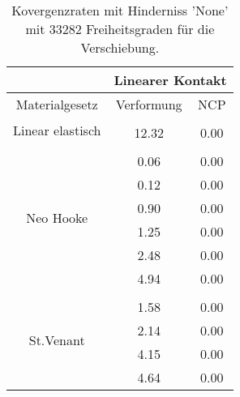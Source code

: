\begin{table} 
\centering 
\begin{tabular}{c|cc|} 
\cline{2-3} 
 & \multicolumn{2}{|c|}{Linearer Kontakt} \\ 
\hline 
\multicolumn{1}{|c|}{Materialgesetz} & \multicolumn{1}{c|}{Verformung} & \multicolumn{1}{c|}{NCP} \\ 
\hline 
\multicolumn{1}{|c|}{\multirow{2}{*}{Linear elastisch}} &\multicolumn{1}{|c|}{} & \multicolumn{1}{|c|}{} \\ 
\multicolumn{1}{|c|}{} & \multicolumn{1}{|c|}{     12.32} & \multicolumn{1}{|c|}{      0.00} \\ 
\hline 
\multicolumn{1}{|c|}{\multirow{7}{*}{Neo Hooke}} &\multicolumn{1}{|c|}{} & \multicolumn{1}{|c|}{} \\ 
\multicolumn{1}{|c|}{} & \multicolumn{1}{|c|}{      0.06} & \multicolumn{1}{|c|}{      0.00} \\ 
\multicolumn{1}{|c|}{} & \multicolumn{1}{|c|}{      0.12} & \multicolumn{1}{|c|}{      0.00} \\ 
\multicolumn{1}{|c|}{} & \multicolumn{1}{|c|}{      0.90} & \multicolumn{1}{|c|}{      0.00} \\ 
\multicolumn{1}{|c|}{} & \multicolumn{1}{|c|}{      1.25} & \multicolumn{1}{|c|}{      0.00} \\ 
\multicolumn{1}{|c|}{} & \multicolumn{1}{|c|}{      2.48} & \multicolumn{1}{|c|}{      0.00} \\ 
\multicolumn{1}{|c|}{} & \multicolumn{1}{|c|}{      4.94} & \multicolumn{1}{|c|}{      0.00} \\ 
\hline 
\multicolumn{1}{|c|}{\multirow{5}{*}{St.Venant}} &\multicolumn{1}{|c|}{} & \multicolumn{1}{|c|}{} \\ 
\multicolumn{1}{|c|}{} & \multicolumn{1}{|c|}{      1.58} & \multicolumn{1}{|c|}{      0.00} \\ 
\multicolumn{1}{|c|}{} & \multicolumn{1}{|c|}{      2.14} & \multicolumn{1}{|c|}{      0.00} \\ 
\multicolumn{1}{|c|}{} & \multicolumn{1}{|c|}{      4.15} & \multicolumn{1}{|c|}{      0.00} \\ 
\multicolumn{1}{|c|}{} & \multicolumn{1}{|c|}{      4.64} & \multicolumn{1}{|c|}{      0.00} \\ 
\hline 
\end{tabular}\caption{Kovergenzraten mit Hinderniss 'None' mit 33282 Freiheitsgraden für die Verschiebung.}\label{tab:Rate_None_level6}
\end{table} 
